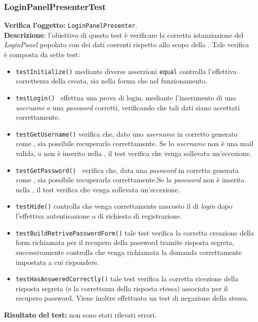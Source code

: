 \subsubsection{LoginPanelPresenterTest}
\textbf{Verifica l'oggetto:} \texttt{LoginPanelPresenter}.\\
\textbf{Descrizione}: l'obiettivo di questo test è verificare la corretta istanziazione del \textit{LoginPanel} popolato con dei dati coerenti rispetto allo scopo della .
Tale verifica è composta da sette test:
\begin{itemize} 
\item \texttt{testInitialize()} mediante diverse asserzioni \texttt{equal} controlla l'effettiva correttezza della  creata, sia nella forma che nel funzionamento.
\item \texttt{testLogin() } effettua una prova di login, mediante l'inserimento di uno \textit{username} e una \textit{password} corretti, verificando che tali dati siano accettati correttamente.
\item \texttt{testGetUsername()} verifica che, dato uno \textit{username} in  corretto generato come , sia possibile recuperarlo correttamente. Se lo \textit{username} non è una mail valida, o non è inserito nella , il test verifica che venga sollevata un'eccezione.
\item \texttt{testGetPassword() } verifica che, data una \textit{password} in  corretta generata come , sia possibile recuperarla correttamente.Se la \textit{password} non è inserita nella , il test verifica che venga sollevata un'eccezione.
\item \texttt{testHide()} controlla che venga correttamente nascosto il  di \textit{login} dopo l'effettiva autenticazione o di richiesta di registrazione.
\item \texttt{testBuildRetrivePasswordForm()} tale test verifica la corretta creazione della form richiamata per il recupero della password tramite risposta segreta, successivamente controlla che venga richiamata la domanda correttamente impostata a cui rispondere.
\item \texttt{testHasAnsweredCorrectly()} tale test verifica la corretta ricezione della risposta segreta (e la correttezza della risposta stessa) associata per il recupero password. Viene inoltre effettuato un test di negazione della stessa.
\end{itemize}
\textbf{Risultato del test:} non sono stati rilevati errori.

